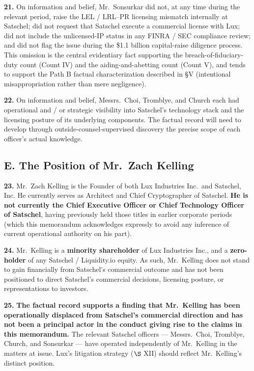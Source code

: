 \documentclass[11pt,letterpaper]{article}
\begin{document}
\textbf{21.} On information and belief, Mr.\ Sonsurkar did not, at any
time during the relevant period, raise the LEL / LRL--PR licensing
mismatch internally at Satschel; did not request that Satschel
execute a commercial license with Lux; did not include the
unlicensed-IP status in any FINRA / SEC compliance review; and did
not flag the issue during the \$1.1 billion capital-raise diligence
process. This omission is the central evidentiary fact supporting the
breach-of-fiduciary-duty count (Count IV) and the aiding-and-abetting
count (Count V), and tends to support the Path B factual
characterization described in \S V (intentional misappropriation
rather than mere negligence).

\textbf{22.} On information and belief, Messrs.\ Choi, Tromblye, and
Church each had operational and / or strategic visibility into
Satschel's technology stack and the licensing posture of its
underlying components. The factual record will need to develop
through outside-counsel-supervised discovery the precise scope of
each officer's actual knowledge.

\subsection*{E. The Position of Mr.\ Zach Kelling}

\textbf{23.} Mr.\ Zach Kelling is the Founder of both Lux Industries
Inc.\ and Satschel, Inc. He currently serves as Architect and Chief
Cryptographer of Satschel. \textbf{He is not currently the Chief
Executive Officer or Chief Technology Officer of Satschel}, having
previously held those titles in earlier corporate periods (which
this memorandum acknowledges expressly to avoid any inference of
current operational authority on his part).

\textbf{24.} Mr.\ Kelling is a \textbf{minority shareholder} of Lux
Industries Inc., and a \textbf{zero-holder} of any Satschel /
Liquidity.io equity. As such, Mr.\ Kelling does not stand to gain
financially from Satschel's commercial outcome and has not been
positioned to direct Satschel's commercial decisions, licensing
posture, or representations to investors.

\textbf{25.} \textbf{The factual record supports a finding that Mr.\
Kelling has been operationally displaced from Satschel's commercial
direction and has not been a principal actor in the conduct giving
rise to the claims in this memorandum.} The relevant Satschel
officers --- Messrs.\ Choi, Tromblye, Church, and Sonsurkar --- have
operated independently of Mr.\ Kelling in the matters at issue. Lux's
litigation strategy ($\S$ XII) should reflect Mr.\ Kelling's distinct
position.
\end{document}
